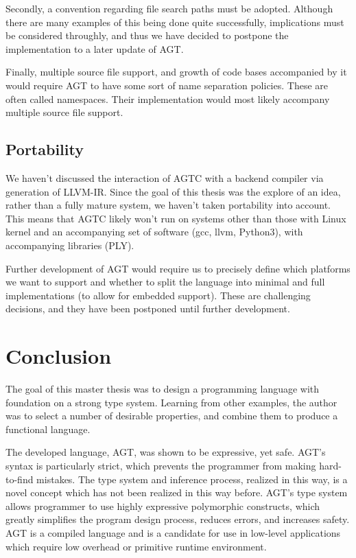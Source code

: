 \documentclass[times, utf8, diplomski]{fer}
\theoremstyle{definition}
\begin{document}
Secondly, a convention regarding file search paths must be adopted. Although there are many
examples of this being done quite successfully, implications must be considered throughly,
and thus we have decided to postpone the implementation to a later update of AGT.

Finally, multiple source file support, and growth of code bases accompanied by it would require
AGT to have some sort of name separation policies. These are often called namespaces.
Their implementation would most likely accompany multiple source file support.

\section{Portability}

We haven't discussed the interaction of AGTC with a backend compiler via generation of LLVM-IR.
Since the goal of this thesis was the explore of an idea, rather than a fully mature system,
we haven't taken portability into account. This means that AGTC likely won't run on systems
other than those with Linux kernel and an accompanying set of software (gcc, llvm, Python3),
with accompanying libraries (PLY).

Further development of AGT would require us to precisely define which platforms we want to support and
whether to split the language into minimal and full implementations (to allow for embedded support).
These are challenging decisions, and they have been postponed until further development.

\chapter{Conclusion}\label{chap:concl}

The goal of this master thesis was to design a programming language with foundation
on a strong type system. Learning from other examples, the author was to select a number
of desirable properties, and combine them to produce a functional language.

The developed language, AGT, was shown to be expressive, yet safe. 
AGT's syntax is particularly strict, which prevents the programmer from making hard-to-find mistakes.
The type system and inference process, realized in this way, is a novel concept which 
has not been realized in this way before. AGT's type system allows programmer to use
highly expressive polymorphic constructs, which greatly simplifies the program design process,
reduces errors, and increases safety. AGT is a compiled language and is a candidate
for use in low-level applications which require low overhead or primitive runtime environment.
\end{document}
